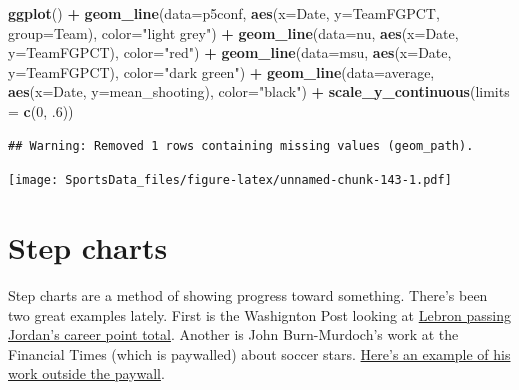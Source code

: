 \documentclass[]{book}
\newenvironment{Shaded}{\begin{snugshade}}{\end{snugshade}}
\newcommand{\KeywordTok}[1]{\textcolor[rgb]{0.13,0.29,0.53}{\textbf{#1}}}
\newcommand{\DataTypeTok}[1]{\textcolor[rgb]{0.13,0.29,0.53}{#1}}
\newcommand{\DecValTok}[1]{\textcolor[rgb]{0.00,0.00,0.81}{#1}}
\newcommand{\StringTok}[1]{\textcolor[rgb]{0.31,0.60,0.02}{#1}}
\newcommand{\OperatorTok}[1]{\textcolor[rgb]{0.81,0.36,0.00}{\textbf{#1}}}
\newcommand{\NormalTok}[1]{#1}
\begin{document}
\begin{Shaded}
\begin{Highlighting}[]
\KeywordTok{ggplot}\NormalTok{() }\OperatorTok{+}\StringTok{ }\KeywordTok{geom_line}\NormalTok{(}\DataTypeTok{data=}\NormalTok{p5conf, }\KeywordTok{aes}\NormalTok{(}\DataTypeTok{x=}\NormalTok{Date, }\DataTypeTok{y=}\NormalTok{TeamFGPCT, }\DataTypeTok{group=}\NormalTok{Team), }\DataTypeTok{color=}\StringTok{"light grey"}\NormalTok{) }\OperatorTok{+}\StringTok{ }\KeywordTok{geom_line}\NormalTok{(}\DataTypeTok{data=}\NormalTok{nu, }\KeywordTok{aes}\NormalTok{(}\DataTypeTok{x=}\NormalTok{Date, }\DataTypeTok{y=}\NormalTok{TeamFGPCT), }\DataTypeTok{color=}\StringTok{"red"}\NormalTok{) }\OperatorTok{+}\StringTok{ }\KeywordTok{geom_line}\NormalTok{(}\DataTypeTok{data=}\NormalTok{msu, }\KeywordTok{aes}\NormalTok{(}\DataTypeTok{x=}\NormalTok{Date, }\DataTypeTok{y=}\NormalTok{TeamFGPCT), }\DataTypeTok{color=}\StringTok{"dark green"}\NormalTok{) }\OperatorTok{+}\StringTok{ }\KeywordTok{geom_line}\NormalTok{(}\DataTypeTok{data=}\NormalTok{average, }\KeywordTok{aes}\NormalTok{(}\DataTypeTok{x=}\NormalTok{Date, }\DataTypeTok{y=}\NormalTok{mean_shooting), }\DataTypeTok{color=}\StringTok{"black"}\NormalTok{) }\OperatorTok{+}\StringTok{ }\KeywordTok{scale_y_continuous}\NormalTok{(}\DataTypeTok{limits =} \KeywordTok{c}\NormalTok{(}\DecValTok{0}\NormalTok{, .}\DecValTok{6}\NormalTok{))}
\end{Highlighting}
\end{Shaded}

\begin{verbatim}
## Warning: Removed 1 rows containing missing values (geom_path).
\end{verbatim}

\texttt{[image: SportsData\_files/figure-latex/unnamed-chunk-143-1.pdf]}

\chapter{Step charts}\label{step-charts}

Step charts are a method of showing progress toward something. There's
been two great examples lately. First is the Washignton Post looking at
\href{https://www.washingtonpost.com/graphics/sports/lebron-james-michael-jordan-nba-scoring-list/?utm_term=.481074150849}{Lebron
passing Jordan's career point total}. Another is John Burn-Murdoch's
work at the Financial Times (which is paywalled) about soccer stars.
\href{http://johnburnmurdoch.github.io/projects/goal-lines/CL/}{Here's
an example of his work outside the paywall}.
\end{document}
